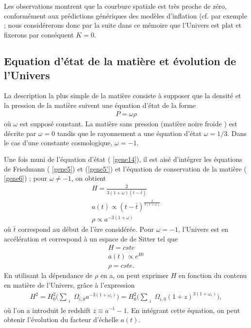 \documentclass[a4paper,12pt]{report}
\theoremstyle{plain}
\theoremstyle{plain}
\begin{document}
Les observations \cite{177} montrent que la courbure spatiale est tr\`es proche de z\'ero, 
conform\'ement aux pr\'edictions g\'en\'eriques des mod\`eles d'inflation (cf. par exemple \cite{215}
; nous consid\'ererons donc par la suite dans ce m\'emoire que l'Univers est plat et fixerons
par cons\'equent $ K = 0 $.
 
 \subsection{Equation d'\'etat de la mati\`ere et \'evolution de l'Univers
}

La description la plus simple de la mati\`ere consiste \`a supposer que la densit\'e et la
pression de la mati\`ere suivent une \'equation d'\'etat de la forme
\begin{eqnarray}
  P = \omega \rho   \label{gene14}
\end{eqnarray}
o\`u $ \omega $ est suppos\'e constant. La mati\`ere sans pression (mati\`ere noire froide ) est d\'ecrite
par $ \omega = 0 $ tandis que le rayonnement a une \'equation d'\'etat  $ \omega = 1/3 $. Dans le cas d'une
constante cosmologique, $ \omega = -1 $.

Une fois muni de l'\'equation d'\'etat ( \ref{gene14}), il est ais\'e d'int\'egrer les \'equations de 
Friedmann ( \ref{gene5}) et (\ref{gene5'}) et l'\'equation de conservation de la mati\`ere ( \ref{gene6}) ; pour $ \omega \neq  -1 $, on
obtient
\begin{eqnarray}
 H = \frac{2}{ 3(1 +  \omega )(t - \bar{t}) } \label{gene15}  \\ a(t) \propto  (t- \bar{t})^{ \frac{2}{ 3(1+ \omega)}} \label{gene19} \\
 \rho \propto a^{ -3( 1 + \omega)} \label{gene20}
\end{eqnarray}
o\`u $\bar{t}$ correspond au d\'ebut de l'\`ere consid\'er\'ee. Pour $ \omega  = -1$, l'Univers est en acc\'el\'eration
et correspond \`a un espace de de Sitter tel que
\begin{eqnarray}
 H = cste  \\ a(t) \propto e^{H t}  \\ \rho = cste.
\end{eqnarray}
En utilisant la d\'ependance de $ \rho $ en a, on peut exprimer $H$ en fonction du contenu en
mati\`ere de l'Univers, gr\^ace \`a l'expression
\begin{eqnarray}
 H^2 = H_0^2 \Biggl( \sum_{\substack{i}} \Omega_{i,0} a^{-3(1 + \omega_i)} \Biggl) = 
 H_0^2 \Biggl( \sum_{\substack{i}} \Omega_{i,0} (1+z)^{3(1 + \omega_i)} \Biggl), \label{gene21}
\end{eqnarray}
o\`u l'on a introduit le redshift $  z \equiv  a^{-1} - 1 $. En int\'egrant cette \'equation, on peut obtenir
l'\'evolution du facteur d'\'echelle $ a(t)$.
\end{document}
